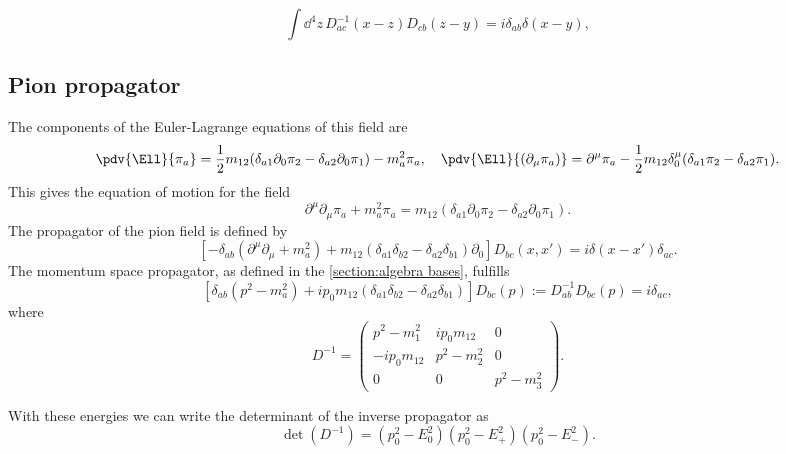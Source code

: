 \documentclass{article}
\begin{document}
\begin{equation}
    \int \dd^4 z \, D_{ac}^{-1}(x-z) D_{cb}(z - y) = i \delta_{ab}\delta(x - y),
\end{equation}

\subsection{Pion propagator}

The components of the Euler-Lagrange equations of this field are
\begin{equation*}
    \pdv{\Ell}{\pi_a} = 
    \frac{1}{2} m_{12} (\delta_{a1} \partial_0 \pi_2 - \delta_{a2}\partial_0 \pi_1) 
    - m^2_{a} \pi_a, \quad
    \pdv{\Ell}{(\partial_\mu \pi_a)} = 
    \partial^\mu \pi_a - \frac{1}{2} m_{12} \delta^\mu_0 (\delta_{a1}\pi_2  - \delta_{a2}\pi_1).
\end{equation*}
This gives the equation of motion for the field
\begin{equation}
    \partial^\mu \partial_\mu \pi_a + m_a^2 \pi_a
    =  m_{12}(\delta_{a1} \partial_0 \pi_2  - \delta_{a2} \partial_0 \pi_1).
\end{equation}
The propagator of the pion field is defined by
\begin{equation}
    \left[
        - \delta_{ab}(\partial^\mu\partial_\mu + m^2_a)
        +  m_{12}(\delta_{a1} \delta_{b2} - \delta_{a2}\delta_{b1}) \partial_0
    \right] 
    D_{bc}(x, x') 
    = i \delta(x - x') \delta_{ac}.
\end{equation}
The momentum space propagator, as defined in the \autoref{section:algebra bases}, fulfills
\begin{equation*}
    \left[
        \delta_{ab}(p^2 - m_a^2)
        +  i p_0 m_{12}(\delta_{a1} \delta_{b2} - \delta_{a2}\delta_{b1}) 
    \right] 
     D_{bc}(p) 
    := D^{-1}_{ab}  D_{bc}(p) = i \delta_{ac},
\end{equation*}
where
\begin{equation*}
    D^{-1} =
    \begin{pmatrix}
        p^2 - m^2_1             & i p_0 m_{12}     & 0             \\
        - i p_0 m_{12}            & p^2 - m^2_2       & 0             \\
        0                       & 0                 & p^2 - m^2_3
    \end{pmatrix}.
\end{equation*}

With these energies we can write the determinant of the inverse propagator as
\begin{equation}
    \det(D^{-1}) = (p_0^2 - E_0^2) (p_0^2 - E_+^2) (p_0^2 - E_-^2).
\end{equation}
\end{document}
